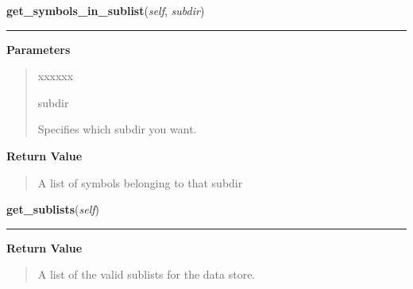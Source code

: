     \vspace{0.5ex}

\hspace{.8\funcindent}\begin{boxedminipage}{\funcwidth}

    \raggedright \textbf{get\_symbols\_in\_sublist}(\textit{self}, \textit{subdir})

    \vspace{-1.5ex}

    \rule{\textwidth}{0.5\fboxrule}
\setlength{\parskip}{2ex}
\setlength{\parskip}{1ex}
      \textbf{Parameters}
      \vspace{-1ex}

      \begin{quote}
        \begin{Ventry}{xxxxxx}

          \item[subdir]

          Specifies which subdir you want.

        \end{Ventry}

      \end{quote}

      \textbf{Return Value}
    \vspace{-1ex}

      \begin{quote}
      A list of symbols belonging to that subdir

      \end{quote}

    \end{boxedminipage}

    \label{trunk:qstkutil:DataAccess:DataAccess:get_sublists}

    \vspace{0.5ex}

\hspace{.8\funcindent}\begin{boxedminipage}{\funcwidth}

    \raggedright \textbf{get\_sublists}(\textit{self})

    \vspace{-1.5ex}

    \rule{\textwidth}{0.5\fboxrule}
\setlength{\parskip}{2ex}
\setlength{\parskip}{1ex}
      \textbf{Return Value}
    \vspace{-1ex}

      \begin{quote}
      A list of the valid sublists for the data store.

      \end{quote}

    \end{boxedminipage}

